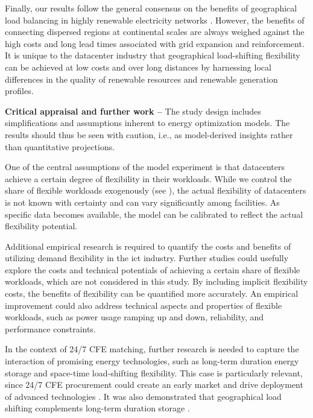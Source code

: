 Finally, our results follow the general consensus on the benefits of geographical load balancing in highly renewable electricity networks \cite{schlachtbergerBenefitsCooperationHighly2017}.
However, the benefits of connecting dispersed regions at continental scales are always weighed against the high costs and long lead times associated with grid expansion and reinforcement.
It is unique to the datacenter industry that geographical load-shifting flexibility can be achieved at low costs and over long distances by harnessing local differences in the quality of renewable resources and renewable generation profiles.

\textbf{Critical appraisal and further work --} The study design includes simplifications and assumptions inherent to energy optimization models. The results should thus be seen with caution, i.e., as model-derived insights rather than quantitative projections.

One of the central assumptions of the model experiment is that datacenters achieve a certain degree of flexibility in their workloads. While we control the share of flexible workloads exogenously (see ), the actual flexibility of datacenters is not known with certainty and can vary significantly among facilities.
As specific data becomes available, the model can be calibrated to reflect the actual flexibility potential.

Additional empirical research is required to quantify the costs and benefits of utilizing demand flexibility in the \gls{ict} industry.
Further studies could usefully explore the costs and technical potentials of achieving a certain share of flexible workloads, which are not considered in this study.
By including implicit flexibility costs, the benefits of flexibility can be quantified more accurately.
An empirical improvement could also address technical aspects and properties of flexible workloads, such as power usage ramping up and down, reliability, and performance constraints.

In the context of 24/7 CFE matching, further research is needed to capture the interaction of promising energy technologies, such as long-term duration energy storage and space-time load-shifting flexibility.
This case is particularly relevant, since 24/7 CFE procurement could create an early market and drive deployment of advanced technologies \cite{xu-247CFE-report,riepinMeansCostsSystemlevel2023}.
It was also demonstrated that geographical load shifting complements long-term duration storage \cite{riepinValueSpacetimeLoadshifting2023}.
